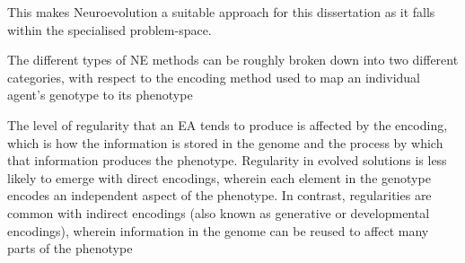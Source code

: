 This makes Neuroevolution a suitable approach for this dissertation as it falls within the specialised problem-space.





The different types of NE methods can be roughly broken down into two different categories, with respect to the encoding method used to map an individual agent's genotype to its phenotype %


The level of regularity that an EA tends to produce is affected by the encoding, which is how the information is stored in the genome and the process by which that information produces the phenotype. 
Regularity in evolved solutions is less likely to emerge with direct encodings, wherein each element in the genotype encodes an independent aspect of the phenotype.
In contrast, regularities are common with indirect encodings (also known as generative or developmental encodings), wherein information in the genome can be reused to affect many parts of the phenotype


